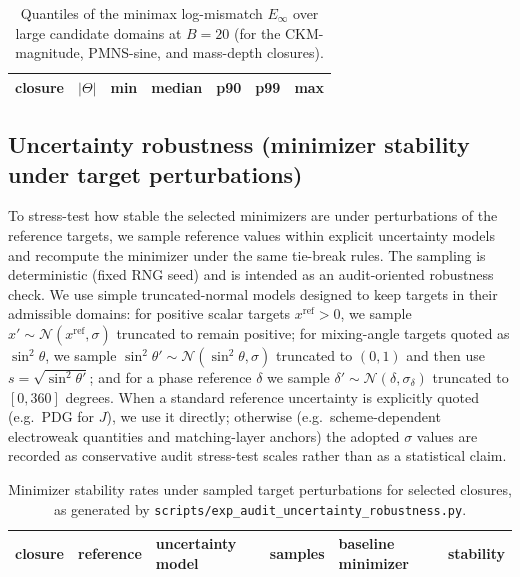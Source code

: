 \begin{table}[H]
\centering
\scriptsize
\setlength{\tabcolsep}{6pt}
\renewcommand{\arraystretch}{1.15}
\begin{tabular}{lrrrrrr}
\toprule
closure & $|\Theta|$ & min & median & p90 & p99 & max \\
\midrule
%
\end{tabular}
\caption{Quantiles of the minimax log-mismatch $E_\infty$ over large candidate domains at $B=20$ (for the CKM-magnitude, PMNS-sine, and mass-depth closures).}
\label{tab:audit_closure_quantiles}
\end{table}

\subsection{Uncertainty robustness (minimizer stability under target perturbations)}
\label{app:audit_uncertainty}

To stress-test how stable the selected minimizers are under perturbations of the reference targets,
we sample reference values within explicit uncertainty models and recompute the minimizer under the same tie-break rules.
The sampling is deterministic (fixed RNG seed) and is intended as an audit-oriented robustness check.
We use simple truncated-normal models designed to keep targets in their admissible domains:
for positive scalar targets $x^{\mathrm{ref}}>0$, we sample $x'\sim\mathcal{N}(x^{\mathrm{ref}},\sigma)$ truncated to remain positive;
for mixing-angle targets quoted as $\sin^2\theta$, we sample $\sin^2\theta'\sim\mathcal{N}(\sin^2\theta,\sigma)$ truncated to $(0,1)$ and then use $s=\sqrt{\sin^2\theta'}$;
and for a phase reference $\delta$ we sample $\delta'\sim\mathcal{N}(\delta,\sigma_\delta)$ truncated to $[0,360]$ degrees.
When a standard reference uncertainty is explicitly quoted (e.g.\ PDG for $J$), we use it directly; otherwise (e.g.\ scheme-dependent electroweak quantities and matching-layer anchors) the adopted $\sigma$ values are recorded as conservative audit stress-test scales rather than as a statistical claim.

\begin{landscape}
\begin{table}[H]
\centering
\scriptsize
\setlength{\tabcolsep}{6pt}
\renewcommand{\arraystretch}{1.15}
\begin{tabular}{lllrll}
\toprule
closure & reference & uncertainty model & samples & baseline minimizer & stability \\
\midrule
%
\end{tabular}
\caption{Minimizer stability rates under sampled target perturbations for selected closures, as generated by \texttt{scripts/exp\_audit\_uncertainty\_robustness.py}.}
\label{tab:audit_uncertainty_robustness}
\end{table}
\end{landscape}

